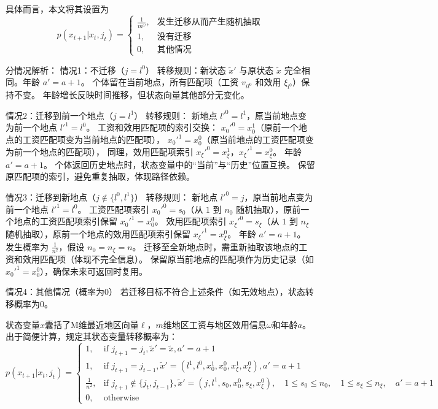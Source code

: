 \documentclass[a4paper,12pt,oneside, fontset=mac]{ctexbook} %
\begin{document}
具体而言，本文将其设置为
\begin{equation}
  p(x_{t+1}|x_t,j_t)=
  \begin{cases}
    \frac{1}{m^\omega}
    , &\text{发生迁移从而产生随机抽取}
    \\
    1
    , &\text{没有迁移}
    \\
    0
    , &\text{其他情况}
  \end{cases}
\end{equation}

分情况解析：
情况1：不迁移（$j = l^0$）
转移规则：新状态 $\tilde{x}'$ 与原状态 $\tilde{x}$ 完全相同。年龄 $a' = a + 1$。
个体留在当前地点，所有匹配项（工资 $v_{il^0}$ 和效用 $\xi_{l^0}$）保持不变。
年龄增长反映时间推移，但状态向量其他部分无变化。

情况2：迁移到前一个地点（$j = l^1$）
转移规则：
新地点 $l'^0 = l^1$，原当前地点变为前一个地点 $l'^1 = l^0$。
工资和效用匹配项的索引交换：  
$x_0'^0 = x_0^1$（原前一个地点的工资匹配项变为当前地点的匹配项），  
$x_0'^1 = x_0^0$（原当前地点的工资匹配项变为前一个地点的匹配项），  
同理，效用匹配项索引 $x_\xi'^0 = x_\xi^1$，$x_\xi'^1 = x_\xi^0$。
年龄 $a' = a + 1$。
个体返回历史地点时，状态变量中的“当前”与“历史”位置互换。
保留原匹配项的索引，避免重复抽取，体现路径依赖。

情况3：迁移到新地点（$j \notin \{l^0, l^1\}$）
转移规则：
新地点 $l'^0 = j$，原当前地点变为前一个地点 $l'^1 = l^0$。
工资匹配项索引 $x_0'^0 = s_0$（从 $1$ 到 $n_0$ 随机抽取），原前一个地点的工资匹配项索引保留 $x_0'^1 = x_0^0$。
效用匹配项索引 $x_\xi'^0 = s_\xi$（从 $1$ 到 $n_\xi$ 随机抽取），原前一个地点的效用匹配项索引保留 $x_\xi'^1 = x_\xi^0$。
年龄 $a' = a + 1$。
发生概率为 $\frac{1}{n^2}$，假设 $n_0 = n_\xi = n$。
迁移至全新地点时，需重新抽取该地点的工资和效用匹配项（体现不完全信息）。
保留原当前地点的匹配项作为历史记录（如 $x_0'^1 = x_0^0$），确保未来可返回时复用。

情况4：其他情况（概率为0）
若迁移目标不符合上述条件（如无效地点），状态转移概率为0。




状态变量$x$囊括了M维最近地区向量$\ell$，$m$维地区工资与地区效用信息$\omega$和年龄$a$。出于简便计算，规定其状态变量转移概率为：
\begin{equation}
p(x_{t+1}|x_t, j_t) = 
\begin{cases} 
1, & \text{if } j_{t+1} = j_t, \tilde{x}' = \tilde{x}, a' = a + 1 \\
1, & \text{if } j_{t+1} = j_{t-1}, \tilde{x}' = (l^1, l^0, x_0^1, x_0^0, x_\xi^1, x_\xi^0), a' = a + 1 \\
\frac{1}{n^2}, & \text{if } j_{t+1} \notin \{j_t, j_{t-1}\}, \tilde{x}' = (j, l^1, s_0, x_0^0, s_\xi, x_\xi^0), \quad 1 \leq s_0 \leq n_0, \quad 1 \leq s_\xi \leq n_\xi, \quad a' = a + 1 \\
0, & \text{otherwise}
\end{cases}
\end{equation}
\end{document}
